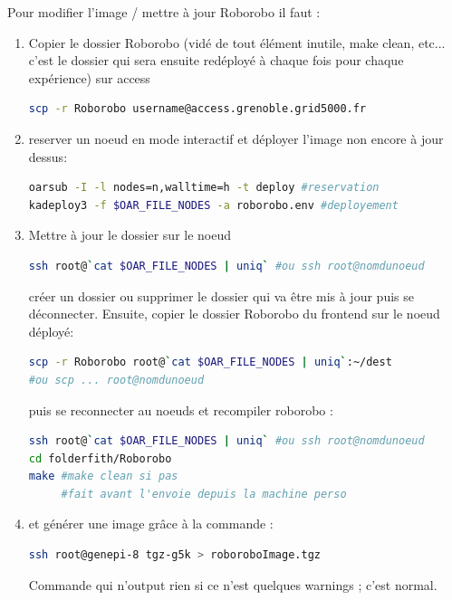 \documentclass[a4paper,10pt]{report}
\begin{document}
Pour modifier l'image / mettre à jour Roborobo il faut :
\begin{enumerate}
 \item Copier le dossier Roborobo (vidé de tout élément inutile, make clean, etc... c'est le dossier qui sera ensuite redéployé à chaque fois pour chaque expérience) sur access  
\begin{lstlisting}[language=bash]
scp -r Roborobo username@access.grenoble.grid5000.fr
\end{lstlisting}
\item reserver un noeud en mode interactif et déployer l'image non encore à jour dessus:
\begin{lstlisting}[language=bash]
oarsub -I -l nodes=n,walltime=h -t deploy #reservation
kadeploy3 -f $OAR_FILE_NODES -a roborobo.env #deployement
\end{lstlisting}
\item Mettre à jour le dossier sur le noeud
\begin{lstlisting}[language=bash]
ssh root@`cat $OAR_FILE_NODES | uniq` #ou ssh root@nomdunoeud
\end{lstlisting}
créer un dossier ou supprimer le dossier qui va être mis à jour puis se déconnecter. Ensuite, copier le dossier Roborobo du frontend sur le noeud déployé:
\begin{lstlisting}[language=bash]
scp -r Roborobo root@`cat $OAR_FILE_NODES | uniq`:~/dest
#ou scp ... root@nomdunoeud
\end{lstlisting}
puis se reconnecter au noeuds et recompiler roborobo :
\begin{lstlisting}[language=bash]
ssh root@`cat $OAR_FILE_NODES | uniq` #ou ssh root@nomdunoeud
cd folderfith/Roborobo
make #make clean si pas 
     #fait avant l'envoie depuis la machine perso
\end{lstlisting}

\item et générer une image grâce à la commande :

\begin{lstlisting}[language=bash]
ssh root@genepi-8 tgz-g5k > roboroboImage.tgz
\end{lstlisting}
Commande qui n'output rien si ce n'est quelques warnings ; c'est normal.



\end{enumerate}
\end{document}
